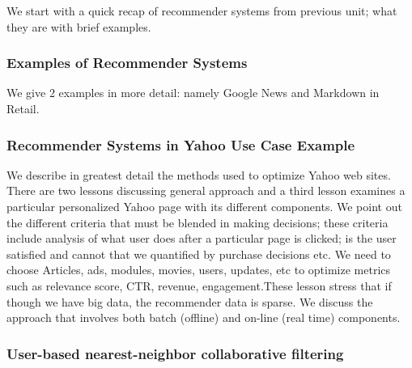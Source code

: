 

We start with a quick recap of recommender systems from previous unit;
what they are with brief examples.


\subsubsection{Examples of Recommender Systems}

We give 2 examples in more detail: namely Google News and Markdown in
Retail.



\subsubsection{Recommender Systems in Yahoo Use Case
Example}

We describe in greatest detail the methods used to optimize Yahoo web
sites. There are two lessons discussing general approach and a third
lesson examines a particular personalized Yahoo page with its different
components. We point out the different criteria that must be blended in
making decisions; these criteria include analysis of what user does
after a particular page is clicked; is the user satisfied and cannot
that we quantified by purchase decisions etc. We need to choose
Articles, ads, modules, movies, users, updates, etc to optimize metrics
such as relevance score, CTR, revenue, engagement.These lesson stress
that if though we have big data, the recommender data is sparse. We
discuss the approach that involves both batch (offline) and on-line
(real time) components.





\subsubsection{User-based nearest-neighbor collaborative filtering}

